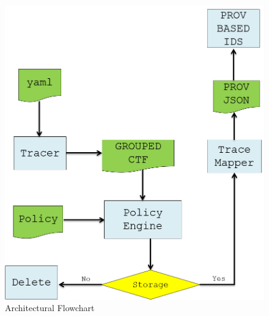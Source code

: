 \begin{figure}[h]
\begin{center}

\includegraphics[width =4.5in]{flowchart.PNG}    
\end{center}
\caption{Architectural Flowchart }
\label{flow_chart}
\end{figure}




%


